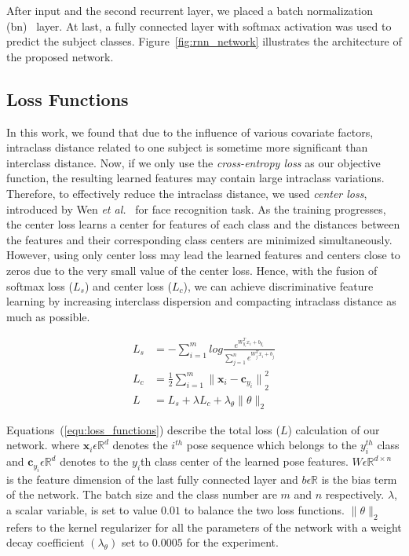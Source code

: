 After input and the second recurrent layer, we placed a batch normalization (\gls{bn})~\cite{Ioffe_15} layer. At last, a fully connected layer with softmax activation was used to predict the subject classes. Figure~\ref{fig:rnn_network} illustrates the architecture of the proposed network. 


\subsection{Loss Functions}
In this work, we found that due to the influence of various covariate factors, intraclass distance related to one subject is sometime more significant than interclass distance. Now, if we only use the \textit{cross-entropy loss} as our objective function, the resulting learned features may contain large intraclass variations. Therefore, to effectively reduce the intraclass distance, we used \textit{center loss}, introduced by Wen \textit{et al.}~\cite{Wen_16} for face recognition task. As the training progresses, the center loss learns a center for features of each class and the distances between the features and their corresponding class centers are minimized simultaneously. However, using only center loss may lead the learned features and centers close to zeros due to the very small value of the center loss. Hence, with the fusion of softmax loss ($L_s$) and center loss ($L_c$), we can achieve discriminative feature learning by increasing interclass dispersion and compacting intraclass distance as much as possible.


\begin{equation} \label{equ:loss_functions}
\begin{split}
L_s &=-\sum_{i=1}^{m}log{\frac{e^{W_{y_i}^{T}x_i + b_{y_i}}}{\sum_{j=1}^{n}{e^{W_{j}^{T}x_i+ b_j}}}} \\
L_c &= \frac{1}{2}\sum_{i=1}^{m}{\parallel{{\boldsymbol x_i}-{\boldsymbol c_{y_i}}}\parallel}_2^2 \\
L &= L_s + \lambda L_c + \lambda_{\theta}\parallel{\theta}\parallel_{2}
\end{split} 
\end{equation}

Equations~(\ref{equ:loss_functions}) describe the total loss ($ L $) calculation of our network. where $\boldsymbol x_{i} \epsilon \mathbb {R}^d$ denotes the $i^{th}$ pose sequence which belongs to the $y_i^{th}$ class and  $\boldsymbol c_{y_i} \epsilon \mathbb {R}^d$ denotes to the $y_i$th class center of the learned pose features. $W \epsilon \mathbb {R}^{d\times n}$ is the feature dimension of the last fully connected layer and $b\epsilon \mathbb {R}$ is the bias term of the network. The batch size and the class number are $ m $ and $ n $ respectively. $\lambda$, a scalar variable, is set to value $ 0.01 $ to balance the two loss functions. $\parallel{\theta}\parallel_{2}$ refers to the kernel regularizer for all the parameters of the network with a weight decay coefficient $(\lambda_{\theta})$ set to $0.0005$ for the experiment.  


